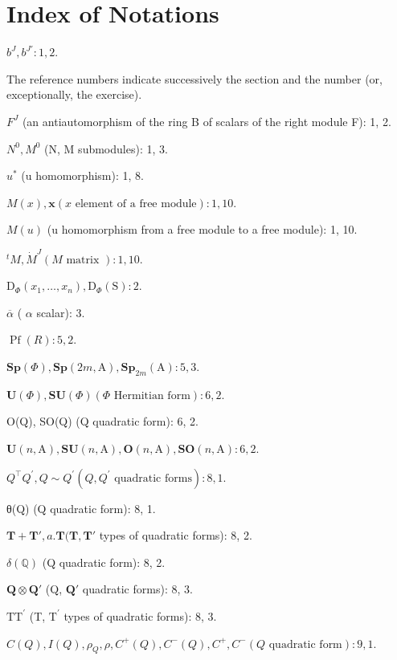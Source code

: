 \chapter*{Index of Notations}
{}

\(b^{J}, b^{J'} : 1, 2.\)

The reference numbers indicate successively the section and the number (or, exceptionally, the exercise).

\(F^{J}\) (an antiautomorphism of the ring B of scalars of the right module F): 1, 2.

\(N^{0}, M^{0}\) (N, M submodules): 1, 3.

\(u^{*}\) (u homomorphism): 1, 8.

\(M(x), \mathbf{x} (x \text{ element of a free module}) : 1, 10.\)

\(M(u)\) (u homomorphism from a free module to a free module): 1, 10.

\(^{t}M, \dot{M}^{J} (M \text { matrix } ): 1, 10.\)

\(\mathrm{D}_{\Phi}(x_{1},\ldots ,x_{n}),\mathrm{D}_{\Phi}(\mathrm{S}):2.\)

\(\overline{\alpha}\) ( \(\alpha\) scalar): 3.

\(\operatorname{Pf}(R):5,2.\)

\(\mathbf{Sp}(\Phi), \mathbf{Sp}(2m, \mathrm{A}), \mathbf{Sp}_{2m}(\mathrm{A}) : 5, 3.\)

\(\mathbf{U}(\Phi), \mathbf{S}\mathbf{U}(\Phi) (\Phi \text{ Hermitian form}) : 6, 2.\)

O(Q), SO(Q) (Q quadratic form): 6, 2.

\(\mathbf{U}(n,\mathrm{A}),\mathbf{S}\mathbf{U}(n,\mathrm{A}),\mathbf{O}(n,\mathrm{A}),\mathbf{SO}(n,\mathrm{A}):6,2.\)

\(Q^{\top}Q^{\prime}, Q \sim Q^{\prime}(Q, Q^{\prime}\text{ quadratic forms}): 8, 1.\)

θ(Q) (Q quadratic form): 8, 1.

\(\mathbf{T} + \mathbf{T}', a. \mathbf{T} (\mathbf{T}, \mathbf{T}'\) types of quadratic forms): 8, 2.

\(\delta (\mathbb{Q})\) (Q quadratic form): 8, 2.

\(\mathbf{Q} \otimes \mathbf{Q}'\) (Q, \(\mathbf{Q}'\) quadratic forms): 8, 3.

\(\mathrm{TT}^{\prime}\) (T, \(\mathrm{T}^{\prime}\) types of quadratic forms): 8, 3.

\(C(Q), I(Q), \rho_{Q}, \rho, C^{+}(Q), C^{-}(Q), C^{+}, C^{-} (Q \text{ quadratic form}): 9, 1.\)

